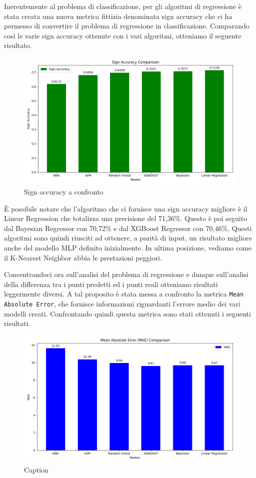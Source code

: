 Inerentemente al problema di classificazione, per gli algoritmi di regressione è stata creata una nuova metrica fittizia denominata sign accuracy che ci ha permesso di convertire il problema di regressione in classificazione.
Comparando così le varie sign accuracy ottenute con i vari algoritmi, otteniamo il seguente risultato.
\begin{figure}[H]
    \centering
    \includegraphics[width=0.7\linewidth]{img/sign_accuracy.png}
    \caption{Sign accuracy a confronto}
    \label{fig:enter-label}
\end{figure}

È possibile notare che l'algoritmo che ci fornisce una sign accuracy migliore è il Linear Regression che totalizza una precisione del 71,36\%. Questo è poi seguito dal Bayesian Regressor con 70,72\% e dal XGBoost Regressor con 70,46\%.
Questi algoritmi sono quindi riusciti ad ottenere, a parità di input, un risultato migliore anche del modello MLP definito inizialmente.
In ultima posizione, vediamo come il K-Nearest Neighbor abbia le prestazioni peggiori. 
\newline

Concentrandoci ora sull'analisi del problema di regressione e dunque sull'analisi della differenza tra i punti predetti ed i punti reali otteniamo risultati leggermente diversi.
A tal proposito è stata messa a confronto la metrica \texttt{Mean Absolute Error}, che fornisce informazioni riguardanti l'errore medio dei vari modelli creati.
Confrontando quindi questa metrica sono stati ottenuti i seguenti risultati.
\begin{figure}[H]
    \centering
    \includegraphics[width=0.7\linewidth]{img/mae_a_confronto.png}
    \caption{Caption}
    \label{fig:enter-label}
\end{figure}

